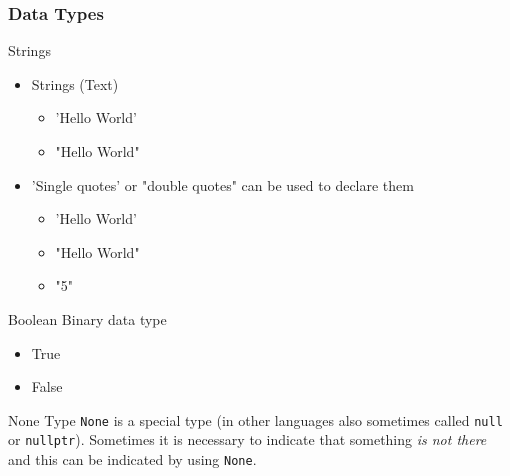 \documentclass[10pt, a4paper]{beamer} %
\begin{document}
\begin{frame}[c, allowframebreaks]\frametitle{Data Types}
  \begin{block}{Strings}
    \begin{itemize}
      \item Strings (Text)
            \begin{itemize}
              \item {\color{blue}'Hello World'}
              \item {\color{red}"Hello World"}
            \end{itemize}
      \item {\color{blue} 'Single quotes'} or {\color{red} "double quotes"} can be used to declare them
            \begin{itemize}
              \item 'Hello World'
              \item "Hello World"
              \item "5"
            \end{itemize}
    \end{itemize}
  \end{block}
  \begin{block}{Boolean}
    Binary data type
    \begin{itemize}
      \item True
      \item False
    \end{itemize}
  \end{block}
  \begin{block}{None Type}
    \texttt{None} is a special type (in other languages also sometimes called \texttt{null} or \texttt{nullptr}).
    Sometimes it is necessary to indicate that something \textit{is not there} and this can be indicated by using \texttt{None}.
  \end{block}


\end{frame}
\end{document}
